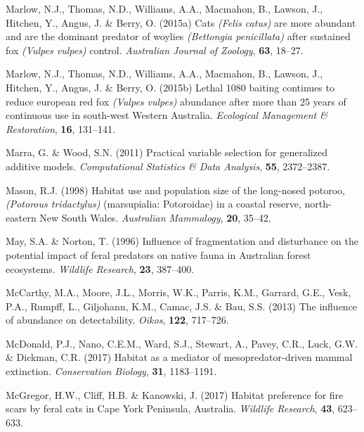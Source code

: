 \documentclass[11pt,a4paper,titlepage,twoside,openright]{style/unimelbthesis}
\begin{document}
\begin{mainmatter}
\leavevmode\hypertarget{ref-marlow2015cats}{}%
Marlow, N.J., Thomas, N.D., Williams, A.A., Macmahon, B., Lawson, J., Hitchen, Y., Angus, J. \& Berry, O. (2015a) Cats \emph{(Felis catus)} are more abundant and are the dominant predator of woylies \emph{(Bettongia penicillata)} after sustained fox \emph{(Vulpes vulpes)} control. \emph{Australian Journal of Zoology}, \textbf{63}, 18--27.

\leavevmode\hypertarget{ref-marlow2015lethal}{}%
Marlow, N.J., Thomas, N.D., Williams, A.A., Macmahon, B., Lawson, J., Hitchen, Y., Angus, J. \& Berry, O. (2015b) Lethal 1080 baiting continues to reduce european red fox \emph{(Vulpes vulpes)} abundance after more than 25 years of continuous use in south-west Western Australia. \emph{Ecological Management \& Restoration}, \textbf{16}, 131--141.

\leavevmode\hypertarget{ref-marra2011practical}{}%
Marra, G. \& Wood, S.N. (2011) Practical variable selection for generalized additive models. \emph{Computational Statistics \& Data Analysis}, \textbf{55}, 2372--2387.

\leavevmode\hypertarget{ref-mason1998habitat}{}%
Mason, R.J. (1998) Habitat use and population size of the long-nosed potoroo, \emph{(Potorous tridactylus)} (marsupialia: Potoroidae) in a coastal reserve, north-eastern New South Wales. \emph{Australian Mammalogy}, \textbf{20}, 35--42.

\leavevmode\hypertarget{ref-may1996influence}{}%
May, S.A. \& Norton, T. (1996) Influence of fragmentation and disturbance on the potential impact of feral predators on native fauna in Australian forest ecosystems. \emph{Wildlife Research}, \textbf{23}, 387--400.

\leavevmode\hypertarget{ref-mccarthy2013influence}{}%
McCarthy, M.A., Moore, J.L., Morris, W.K., Parris, K.M., Garrard, G.E., Vesk, P.A., Rumpff, L., Giljohann, K.M., Camac, J.S. \& Bau, S.S. (2013) The influence of abundance on detectability. \emph{Oikos}, \textbf{122}, 717--726.

\leavevmode\hypertarget{ref-mcdonald2017habitat}{}%
McDonald, P.J., Nano, C.E.M., Ward, S.J., Stewart, A., Pavey, C.R., Luck, G.W. \& Dickman, C.R. (2017) Habitat as a mediator of mesopredator-driven mammal extinction. \emph{Conservation Biology}, \textbf{31}, 1183--1191.

\leavevmode\hypertarget{ref-mcgregor2017habitat}{}%
McGregor, H.W., Cliff, H.B. \& Kanowski, J. (2017) Habitat preference for fire scars by feral cats in Cape York Peninsula, Australia. \emph{Wildlife Research}, \textbf{43}, 623--633.


\end{mainmatter}
\end{document}
